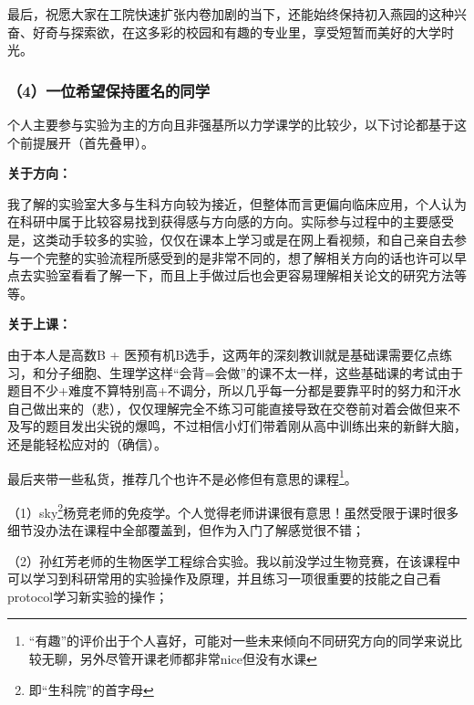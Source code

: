 \vspace{10pt}

最后，祝愿大家在工院快速扩张内卷加剧的当下，还能始终保持初入燕园的这种兴奋、好奇与探索欲，在这多彩的校园和有趣的专业里，享受短暂而美好的大学时光。

\subsubsection{（4）一位希望保持匿名的同学}

个人主要参与实验为主的方向且非强基所以力学课学的比较少，以下讨论都基于这个前提展开（首先叠甲）。

\vspace{10pt}

\textbf{关于方向：}

我了解的实验室大多与生科方向较为接近，但整体而言更偏向临床应用，个人认为在科研中属于比较容易找到获得感与方向感的方向。实际参与过程中的主要感受是，这类动手较多的实验，仅仅在课本上学习或是在网上看视频，和自己亲自去参与一个完整的实验流程所感受到的是非常不同的，想了解相关方向的话也许可以早点去实验室看看了解一下，而且上手做过后也会更容易理解相关论文的研究方法等等。

\vspace{10pt}

\textbf{关于上课：}

由于本人是高数B + 医预有机B选手，这两年的深刻教训就是基础课需要亿点练习，和分子细胞、生理学这样“会背=会做”的课不太一样，这些基础课的考试由于题目不少+难度不算特别高+不调分，所以几乎每一分都是要靠平时的努力和汗水自己做出来的（悲），仅仅理解完全不练习可能直接导致在交卷前对着会做但来不及写的题目发出尖锐的爆鸣，不过相信小灯们带着刚从高中训练出来的新鲜大脑，还是能轻松应对的（确信）。

\vspace{10pt}

最后夹带一些私货，推荐几个也许不是必修但有意思的课程\footnote{“有趣”的评价出于个人喜好，可能对一些未来倾向不同研究方向的同学来说比较无聊，另外尽管开课老师都非常nice但没有水课}。

\vspace{10pt}

（1）sky\footnote{即“生科院”的首字母}杨竞老师的免疫学。个人觉得老师讲课很有意思！虽然受限于课时很多细节没办法在课程中全部覆盖到，但作为入门了解感觉很不错；

\vspace{10pt}

（2）孙红芳老师的生物医学工程综合实验。我以前没学过生物竞赛，在该课程中可以学习到科研常用的实验操作及原理，并且练习一项很重要的技能之自己看protocol学习新实验的操作；

